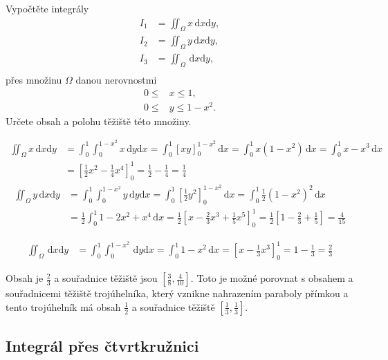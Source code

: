 Vypočtěte integrály
$$
\begin{aligned}
  I_1&=\iint_\Omega x\,\mathrm dx \mathrm dy,\\
  I_2&=\iint_\Omega y\,\mathrm dx \mathrm dy,\\
  I_3&=\iint_\Omega \,\mathrm dx \mathrm dy,\\
\end{aligned}
$$
přes množinu $\Omega$ danou nerovnostmi
$$
\begin{aligned}
  0\leq &x\leq 1,\\
  0\leq &y \leq 1-x^2.
\end{aligned}
$$
Určete obsah a polohu těžiště této množiny.

\reseni

$$
\begin{aligned}
  \iint_\Omega x\,\mathrm dx\mathrm dy
  &=\int_0^1 \int_0^{1-x^2} x\,\mathrm dy\mathrm dx
  =\int_0^1 \left[xy\right]_0^{1-x^2}\,\mathrm dx
  =\int_0^1 x(1-x^2)\,\mathrm dx
  =\int_0^1 x-x^3\,\mathrm dx
  \\&=\left[\frac 12 x^2 - \frac 14 x^4\right]_0^1=\frac 12-\frac 14 =\frac 14
\end{aligned}
$$
$$
\begin{aligned}
  \iint_\Omega y\,\mathrm dx\mathrm dy
  &=\int_0^1 \int_0^{1-x^2} y\,\mathrm dy\mathrm dx
  =\int_0^1 \left[\frac 12 y^2\right]_0^{1-x^2}\,\mathrm dx
  =\int_0^1 \frac 12 (1-x^2)^2\,\mathrm dx
  \\&=\frac 12 \int_0^1 1-2x^2+x^4\,\mathrm dx
  =\frac 12 \left[x-\frac 23 x^3 + \frac 15 x^5\right]_0^1=\frac 12\left[1-\frac 23 + \frac 15\right]=\frac 4{15}
\end{aligned}
$$

$$
\begin{aligned}
  \iint_\Omega \,\mathrm dx\mathrm dy
  &=\int_0^1 \int_0^{1-x^2} \,\mathrm dy\mathrm dx
  =\int_0^1 1-x^2\,\mathrm dx
  =\left[x - \frac 13 x^3\right]_0^1=1-\frac 13 =\frac 23
\end{aligned}
$$

Obsah je $\frac 23$ a souřadnice těžiště jsou $\left[\frac 38,\frac 4{10}\right]$. Toto je možné porovnat s obsahem a souřadnicemi těžiště trojúhelníka, který vznikne nahrazením paraboly přímkou a tento trojúhelník má obsah $\frac 12$ a souřadnice těžiště $\left[\frac 13,\frac 13\right].$

\konec 
\subsection{Integrál přes čtvrtkružnici}

